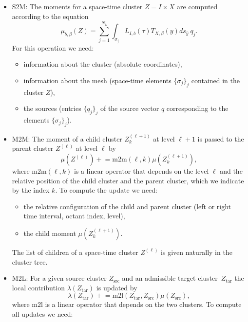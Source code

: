 \documentclass[a4paper,11pt]{article}
\theoremstyle{plain}
\theoremstyle{definition}
\theoremstyle{remark}
\newcommand{\pluseq}{\mathrel{+}=}
\begin{document}
\begin{itemize}
  \item S2M: The moments for a space-time cluster $Z = I \times X$ are computed according to the equation 
    \begin{equation*}
      \mu_{b,\beta}(Z) = \sum_{j=1}^{N_k} \int_{\sigma_j} L_{I,b}(\tau) T_{X,\beta}(y) ds_{\hat{y}}\ q_j.
    \end{equation*}
    For this operation we need:
    \begin{itemize}
      \item information about the cluster (absolute coordinates),
      \item information about the mesh (space-time elements $\{\sigma_j\}_j$ contained in the cluster $Z$),
      \item the sources (entries $\{q_j\}_j$ of the source vector $q$ corresponding to the elements $\{\sigma_j\}_j$).
    \end{itemize}
  \item M2M: The moment of a child cluster $Z_{k}^{(\ell+1)}$ at level $\ell+1$ is passed to the parent cluster 
    $Z^{(\ell)}$ at level $\ell$ by
    \begin{equation*}
      \mu(Z^{(\ell)}) \pluseq \mathrm{m2m}(\ell, k) \mu(Z_{k}^{(\ell+1)}),
    \end{equation*}
    where $\mathrm{m2m}(\ell, k)$ is a linear operator that depends on the level $\ell$ and the relative position of
    the child cluster and the parent cluster, which we indicate by the index $k$. To compute the update we need:
    \begin{itemize}
      \item the relative configuration of the child and parent cluster (left or right time interval, octant index, 
      level),
      \item the child moment $\mu(Z_{k}^{(\ell+1)})$.
    \end{itemize}
    The list of children of a space-time cluster $Z^{(\ell)}$ is given naturally in the cluster tree.
  \item M2L: For a given source cluster $Z_{\mathrm{src}}$ and an admissible target cluster~$Z_{\mathrm{tar}}$ the local
    contribution $\lambda(Z_{\mathrm{tar}})$ is updated by
    \begin{equation*}
      \lambda(Z_{\mathrm{tar}}) \pluseq \mathrm{m2l}(Z_{\mathrm{tar}}, Z_{\mathrm{src}}) \mu(Z_{\mathrm{src}}),
    \end{equation*}
    where $\mathrm{m2l}$ is a linear operator that depends on the two clusters. To compute all updates we need:

\end{itemize}
\end{document}
